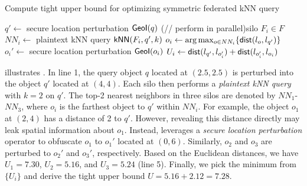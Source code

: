 \setlength{\textfloatsep}{1ex}
\setlength{\floatsep}{1ex}
\begin{algorithm}[t]
	\caption{\small{Compute tight upper bound for optimizing symmetric federated kNN query}}
    \label{alg:knn-UB}
    $q' \gets$ secure location perturbation $\textsf{GeoI}(q)$\;
    \ForEach(// perform in parallel){silo $F_i \in F$}{
    $NN_i \gets$ plaintext kNN query $\textsf{kNN}(F_i,q',k)$
    }
    $o_i \gets \arg\max_{o \in NN_i}\{\textsf{dist}(l_o, l_{q'})\}$\;
    $o_i' \gets$ secure location perturbation $\textsf{GeoI}({o_{i}})$\;
    $U_i \gets \textsf{dist}(l_{q'}, l_{o_i'}) + \textsf{dist}(l_{o_i'}, l_{o_i})$\;
    \;
\end{algorithm}
\afterpage{\global\setlength{\textfloatsep}{\oldtextfloatsep}}
\afterpage{\global\setlength{\floatsep}{\oldfloatsep}}

\begin{example}
     illustrates .
    In line 1, the query object $q$ located at $(2.5, 2.5)$ is perturbed into the object $q'$ located at $(4, 4)$.
    Each silo then performs a \textit{plaintext kNN query} with $k=2$ on $q'$.
    The top-2 nearest neighbors in three silos are denoted by $NN_1$-$NN_3$, where $o_i$ is the farthest object to $q'$ within $NN_i$.
    For example, the object $o_1$ at $(2, 4)$ has a distance of 2 to $q'$.
    However, revealing this distance directly may leak spatial information about $o_1$.
    Instead,  leverages a \textit{secure location perturbation} operator to obfuscate $o_1$ to $o_1'$ located at $(0, 6)$.
    Similarly, $o_2$ and $o_3$ are perturbed to $o_2'$ and $o_3'$, respectively.
    Based on the Euclidean distances, we have $U_1 = 7.30$, $U_2 = 5.16$, and $U_3 = 5.24$ (line 5).
    Finally, we pick the minimum from $\{U_i\}$ and derive the tight upper bound $U = 5.16 + 2.12 = 7.28$.
\end{example}

